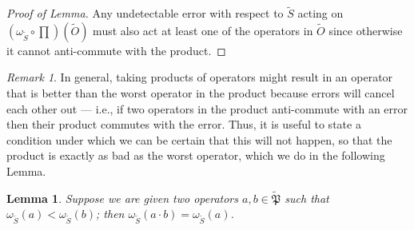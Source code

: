 \documentclass{amsbook}
\theoremstyle{plain}
\newtheorem{lemma}{Lemma}
\theoremstyle{definition}
\theoremstyle{remark}
\newtheorem{remark}{Remark}
\newcommand{\set}{\tilde}
\newcommand{\pauligroup}{{\set{\mathfrak{P}}}}
\newcommand{\om}{\omega}
\begin{document}
\begin{proof}[Proof of Lemma]
Any undetectable error with respect to $\set S$ acting on $(\om_{\set S}\circ \prod)(\set O)$ must also act at least one of the operators in $\set O$ since otherwise it cannot anti-commute with the product. \end{proof}
\begin{remark}
In general, taking products of operators might result in an operator that is better than the worst operator in the product because errors will cancel each other out --- i.e., if two operators in the product anti-commute with an error then their product commutes with the error.  Thus, it is useful to state a condition under which we can be certain that this will not happen, so that the product is exactly as bad as the worst operator, which we do in the following Lemma.
\end{remark}

\begin{lemma}
\label{lesser-operator-wins}
Suppose we are given two operators $a,b\in\pauligroup$ such that $\om_{\set S}(a)<\om_{\set S}(b)$;  then $\om_{\set S}(a\cdot b) = \om_{\set S}(a)$.
\end{lemma}
\end{document}

